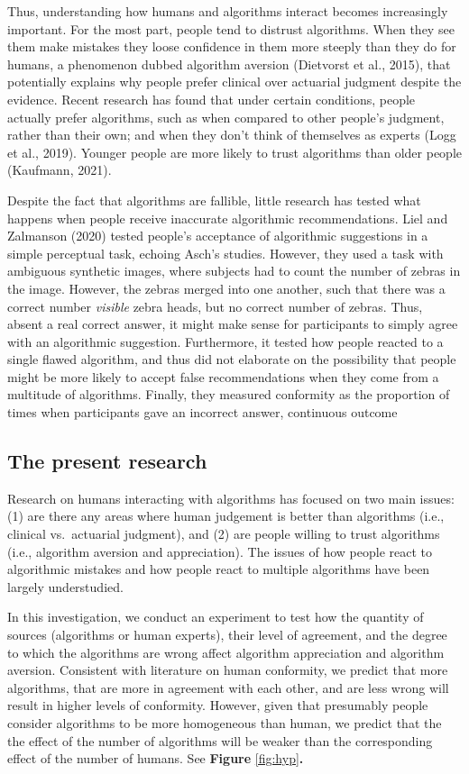 \documentclass[
  man ,floatsintext]{apa7}
\begin{document}
Thus, understanding how humans and algorithms interact becomes increasingly important. For the most part, people tend to distrust algorithms. When they see them make mistakes they loose confidence in them more steeply than they do for humans, a phenomenon dubbed algorithm aversion (Dietvorst et al., 2015), that potentially explains why people prefer clinical over actuarial judgment despite the evidence. Recent research has found that under certain conditions, people actually prefer algorithms, such as when compared to other people's judgment, rather than their own; and when they don't think of themselves as experts (Logg et al., 2019). Younger people are more likely to trust algorithms than older people (Kaufmann, 2021).

Despite the fact that algorithms are fallible, little research has tested what happens when people receive inaccurate algorithmic recommendations. Liel and Zalmanson (2020) tested people's acceptance of algorithmic suggestions in a simple perceptual task, echoing Asch's studies. However, they used a task with ambiguous synthetic images, where subjects had to count the number of zebras in the image. However, the zebras merged into one another, such that there was a correct number \emph{visible} zebra heads, but no correct number of zebras. Thus, absent a real correct answer, it might make sense for participants to simply agree with an algorithmic suggestion. Furthermore, it tested how people reacted to a single flawed algorithm, and thus did not elaborate on the possibility that people might be more likely to accept false recommendations when they come from a multitude of algorithms. Finally, they measured conformity as the proportion of times when participants gave an incorrect answer, continuous outcome

\hypertarget{the-present-research}{%
\subsection{The present research}\label{the-present-research}}

Research on humans interacting with algorithms has focused on two main issues: (1) are there any areas where human judgement is better than algorithms (i.e., clinical vs.~actuarial judgment), and (2) are people willing to trust algorithms (i.e., algorithm aversion and appreciation). The issues of how people react to algorithmic mistakes and how people react to multiple algorithms have been largely understudied.

In this investigation, we conduct an experiment to test how the quantity of sources (algorithms or human experts), their level of agreement, and the degree to which the algorithms are wrong affect algorithm appreciation and algorithm aversion. Consistent with literature on human conformity, we predict that more algorithms, that are more in agreement with each other, and are less wrong will result in higher levels of conformity. However, given that presumably people consider algorithms to be more homogeneous than human, we predict that the the effect of the number of algorithms will be weaker than the corresponding effect of the number of humans. See \textbf{Figure} \ref{fig:hyp}\textbf{.}
\end{document}

